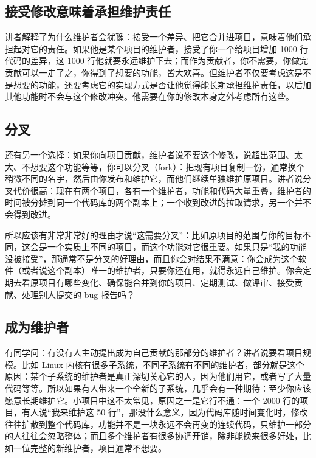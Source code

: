 \documentclass[a4paper]{article}
\begin{document}
\subsection{接受修改意味着承担维护责任}

讲者解释了为什么维护者会犹豫：接受一个差异、把它合并进项目，意味着他们承担起对它的责任。如果他是某个项目的维护者，接受了你一个给项目增加 1000 行代码的差异，这 1000 行他就要永远维护下去；而作为贡献者，你不需要，你做完贡献可以一走了之，你得到了想要的功能，皆大欢喜。但维护者不仅要考虑这是不是想要的功能，还要考虑它的实现方式是否让他觉得能长期承担维护责任，以后加其他功能时不会与这个修改冲突。他需要在你的修改本身之外考虑所有这些。

\subsection{分叉}

还有另一个选择：如果你向项目贡献，维护者说不要这个修改，说超出范围、太大、不想要这个功能等等，你可以分叉（fork）：把现有项目复制一份，通常换个稍微不同的名字，然后由你发布和维护它，而他们继续单独维护原项目。讲者说分叉代价很高：现在有两个项目，各有一个维护者，功能和代码大量重叠，维护者的时间被分摊到同一个代码库的两个副本上；一个收到改进的拉取请求，另一个并不会得到改进。

所以应该有非常非常好的理由才说“这需要分叉”：比如原项目的范围与你的目标不同，这会是一个实质上不同的项目，而这个功能对它很重要。如果只是“我的功能没被接受”，那通常不是分叉的好理由，而且你会对结果不满意：你会成为这个软件（或者说这个副本）唯一的维护者，只要你还在用，就得永远自己维护。你会定期去看原项目有哪些变化、确保能合并到你的项目、定期测试、做评审、接受贡献、处理别人提交的 bug 报告吗？

\subsection{成为维护者}

有同学问：有没有人主动提出成为自己贡献的那部分的维护者？讲者说要看项目规模。比如 Linux 内核有很多子系统，不同子系统有不同的维护者，部分就是这个原因：某个子系统的维护者是真正深切关心它的人，因为他们用它，或者写了大量代码等等。所以如果有人带来一个全新的子系统，几乎会有一种期待：至少你应该愿意长期维护它。小项目中这不太常见，原因之一是它行不通：一个 2000 行的项目，有人说“我来维护这 50 行”，那没什么意义，因为代码库随时间变化时，修改往往扩散到整个代码库，功能并不是一块永远不会再变的连续代码，只维护一部分的人往往会忽略整体；而且多个维护者有很多协调开销，除非能换来很多好处，比如一位完整的新维护者，项目通常不想要。
\end{document}

